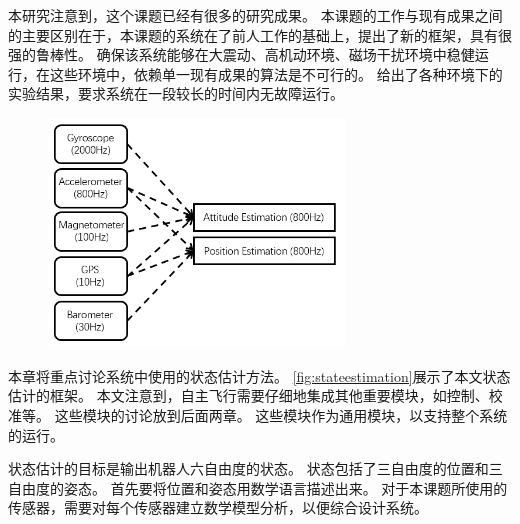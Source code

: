 \documentclass[
  type=master
]{gdutthesis}
\begin{document}
本研究注意到，这个课题已经有很多的研究成果\cite{mahony2008nonlinear,hua2010attitude,khosravian2016state}。
本课题的工作与现有成果之间的主要区别在于，本课题的系统在了前人工作的基础上，提出了新的框架，具有很强的鲁棒性。
确保该系统能够在大震动、高机动环境、磁场干扰环境中稳健运行，在这些环境中，依赖单一现有成果的算法是不可行的。
给出了各种环境下的实验结果，要求系统在一段较长的时间内无故障运行。
\begin{figure}[htbp]
	\centering
	\includegraphics[width=0.7\textwidth]{屏幕截图 2022-03-31 170912.png}
	\label{fig:stateestimation}
\end{figure} 

本章将重点讨论系统中使用的状态估计方法。
\autoref{fig:stateestimation}展示了本文状态估计的框架。
本文注意到，自主飞行需要仔细地集成其他重要模块，如控制、校准等。
这些模块的讨论放到后面两章。
这些模块作为通用模块，以支持整个系统的运行。

状态估计的目标是输出机器人六自由度的状态。
状态包括了三自由度的位置和三自由度的姿态。
首先要将位置和姿态用数学语言描述出来。
对于本课题所使用的传感器，需要对每个传感器建立数学模型分析，以便综合设计系统。
\end{document}
